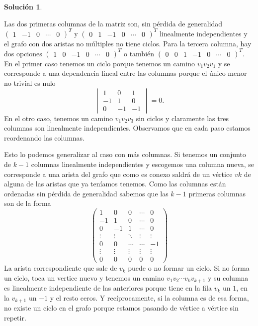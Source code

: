 \documentclass[10pt]{article}
\theoremstyle{definition}
\newtheorem*{sol}{Solución}
\begin{document}
\begin{sol}
\begin{enumerate}[(a)]
Las dos primeras columnas de la matriz son, sin pérdida de generalidad $\begin{pmatrix}
1 & -1 & 0 & \cdots & 0
\end{pmatrix}^T$ y $\begin{pmatrix}
0 & 1 & -1 & 0 & \cdots & 0
\end{pmatrix}^T$ linealmente independientes y el grafo con dos aristas no múltiples no tiene ciclos. Para la tercera columna, hay dos opciones 
$\begin{pmatrix}
1 &  0  & -1 & 0 & \cdots & 0
\end{pmatrix}^T$ o también $\begin{pmatrix}
0 &  0  & 1 & -1 &  0 & \cdots & 0
\end{pmatrix}^T$. En el primer caso tenemos un ciclo porque tenemos un camino $v_1v_2v_1$ y se corresponde a una dependencia lineal entre las columnas porque el único menor no trivial es nulo
$$\begin{vmatrix}
1 & 0 & 1\\
-1 & 1 & 0\\
0 & -1 & -1
\end{vmatrix}=0.$$
En el otro caso, tenemos un camino $v_1v_2v_3$ sin ciclos y claramente las tres columnas son linealmente independientes. Observamos que en cada paso estamos reordenando las columnas.

Esto lo podemos generalizar al caso con más columnas. Si tenemos un conjunto de $k-1$ columnas linealmente independientes y escogemos una columna nueva, se corresponde a una arista del grafo que como es conexo saldrá de un vértice $vk$ de alguna de las aristas que ya teníamos tenemos. Como las columnas están ordenadas sin pérdida de generalidad sabemos que las $k-1$ primeras columnas son de la forma
$$\begin{pmatrix}
1 & 0 & 0 & \cdots & 0\\
-1 & 1 & 0 & \cdots & 0\\
0 & -1 & 1 & \cdots & 0\\
\vdots & \vdots & \ddots & \vdots & \vdots\\
0 & 0 & \cdots & \cdots & -1\\
\vdots & \vdots & \vdots & \vdots & \vdots \\
0 & 0 & 0 & 0 & 0

\end{pmatrix}$$
La arista correspondiente que sale de $v_k$ puede o no formar un ciclo. Si no forma un ciclo, toca un vertice nuevo y tenemos un camino $v_1v_2\cdots v_kv_{k+1}$ y su columna es linealmente independiente de las anteriores porque tiene en la fila $v_k$ un $1$, en la $v_{k+1}$ un $-1$ y el resto ceros. Y recíprocamente, si la columna es de esa forma, no existe un ciclo en el grafo porque estamos pasando de vértice a vértice sin repetir.


\end{enumerate}
\end{sol}
\end{document}
